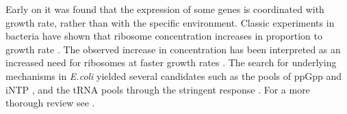 Early on it was found that the expression of some genes is coordinated with growth rate, rather than with the specific environment.
Classic experiments in bacteria have shown that ribosome concentration increases in proportion to growth rate \cite{Schaechter1958}.
The observed increase in concentration has been interpreted as an increased need for ribosomes at faster growth rates \cite{Neidhardt1999,Dennis2004,Zaslaver2009}.
The search for underlying mechanisms in \emph{E.coli} yielded several candidates such as the pools of ppGpp and iNTP \cite{Murray_2003,Bosdriesz_2015}, and the tRNA pools through the stringent response \cite{Chatterji2001,Brauer2008a}.
For a more thorough review see \cite{Nomura1984}.